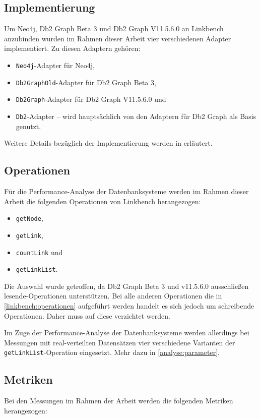 \subsection{Implementierung}
Um Neo4j, Db2 Graph Beta 3 und Db2 Graph V11.5.6.0 an Linkbench anzubinden wurden im Rahmen dieser Arbeit vier verschiedenen Adapter implementiert. Zu diesen Adaptern gehören:
\begin{itemize}
    \item \texttt{Neo4j}-Adapter für Neo4j,
    \item \texttt{Db2GraphOld}-Adapter für Db2 Graph Beta 3, 
    \item \texttt{Db2Graph}-Adapter für Db2 Graph V11.5.6.0 und
    \item \texttt{Db2}-Adapter -- wird hauptsächlich von den Adaptern für Db2 Graph als Basis genutzt.
\end{itemize}
Weitere Details bezüglich der Implementierung werden in  erläutert.

\subsection{Operationen}
Für die Performance-Analyse der Datenbanksysteme werden im Rahmen dieser Arbeit die folgenden Operationen von Linkbench herangezogen:
\begin{itemize}
    \item \texttt{getNode},
    \item \texttt{getLink},
    \item \texttt{countLink} und
    \item \texttt{getLinkList}.
\end{itemize}
Die Auswahl wurde getroffen, da Db2 Graph Beta 3 und v11.5.6.0 ausschließen lesende-Operationen unterstützen. Bei alle anderen Operationen die in \autoref{linkbench:operationen} aufgeführt werden handelt es sich jedoch um schreibende Operationen. Daher muss auf diese verzichtet werden. 

Im Zuge der Performance-Analyse der Datenbanksysteme werden allerdings bei Messungen mit real-verteilten Datensätzen vier verschiedene Varianten der \texttt{getLinkList}-Operation eingesetzt. Mehr dazu in \autoref{analyse:parameter}.


\subsection{Metriken}
Bei den Messungen im Rahmen der Arbeit werden die folgenden Metriken herangezogen: 

